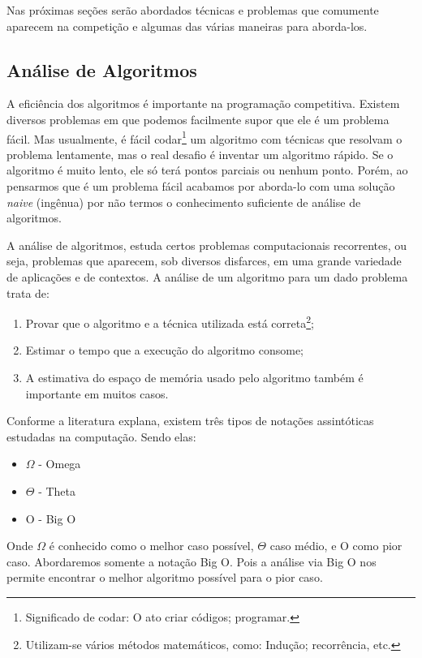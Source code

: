 Nas próximas seções serão abordados técnicas e problemas que comumente aparecem na competição e algumas das várias maneiras para aborda-los.



\subsection{Análise de Algoritmos} %

A eficiência dos algoritmos é importante na programação competitiva. Existem diversos problemas em que podemos facilmente supor que ele é um problema fácil. Mas usualmente, é fácil codar\footnote{Significado de codar: O ato criar códigos; programar.} um algoritmo com técnicas que resolvam o problema lentamente, mas o real desafio é inventar um algoritmo rápido. Se o algoritmo é muito lento, ele só terá pontos parciais ou nenhum ponto. Porém, ao pensarmos que é um problema fácil acabamos por aborda-lo com uma solução \textit{naive} (ingênua) por não termos o conhecimento suficiente de análise de algoritmos. 

A análise de algoritmos, estuda certos problemas computacionais recorrentes, ou seja, problemas que aparecem, sob diversos disfarces, em uma grande variedade de aplicações e de contextos. A análise de um algoritmo para um dado problema trata de:

    \begin{enumerate}
        \item Provar que o algoritmo e a técnica utilizada está correta\footnote{Utilizam-se vários métodos matemáticos, como: Indução; recorrência, etc. };
        \item Estimar o tempo que a execução do algoritmo consome;
        \item A estimativa do espaço de memória usado pelo algoritmo também é importante em muitos casos.
    \end{enumerate}
    
Conforme a literatura explana, existem três tipos de notações assintóticas estudadas na computação. Sendo elas:

    \begin{itemize}
        \item $\Omega$ - Omega
        \item $\Theta$ - Theta
        \item O - Big O
    \end{itemize}
    
Onde $\Omega$ é conhecido como o melhor caso possível, $\Theta$ caso médio, e O como pior caso. Abordaremos somente a notação Big O. Pois a análise via Big O nos permite encontrar o melhor algoritmo possível para o pior caso.
    
